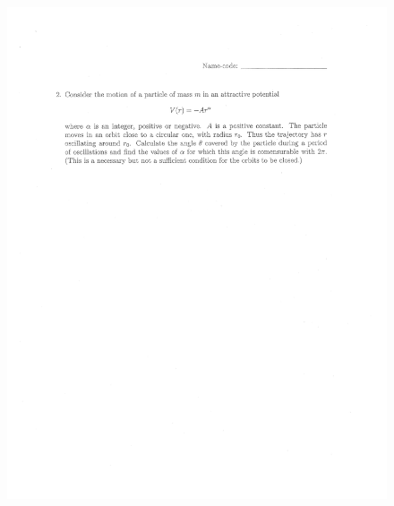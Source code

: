 \documentclass[10pt,a4paper]{article}
\begin{document}
\begin{figure}[H]
 \centering
 \includegraphics[width=16cm]{pdf/1-1T47.png}
\end{figure}
 \newpage
\end{document}
